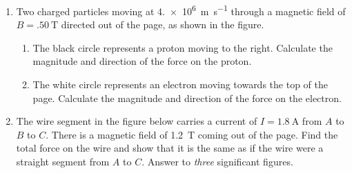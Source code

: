 \begin{enumerate}[itemsep=6pt]
\item Two charged particles moving at \SI{4.e6}{\metre\per\second} through a
  magnetic field of $B=\SI{.50}\tesla$ directed out of the page, as shown in
  the figure.
  \begin{center}
  \end{center}
  \begin{enumerate}[itemsep=3pt]
  \item The black circle represents a proton moving to the right. Calculate
    the magnitude and direction of the force on the proton.
  \item The white circle represents an electron moving towards the top of the
    page. Calculate the magnitude and direction of the force on the electron.
  \end{enumerate}

\item The wire segment in the figure below carries a current of
  $I=\SI{1.8}\ampere$ from $A$ to $B$ to $C$. There is a magnetic field of
  \SI{1.2}{\tesla} coming out of the page. Find the total force on the wire
  and show that it is the same as if the wire were a straight segment from
  $A$ to $C$. Answer to \emph{three} significant figures.
  \begin{center}
  \end{center}
\end{enumerate}
